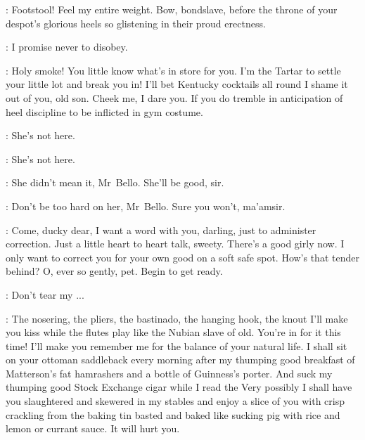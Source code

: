 \Bello:
Footstool!
Feel my entire weight.
Bow, bondslave, before the throne of your despot's glorious heels
so glistening in their proud erectness.

\Bloom:
I promise never to disobey.

\Bello:
Holy smoke!
You little know what's in store for you.
I'm the Tartar to settle your little lot and break you in!
I'll bet Kentucky cocktails all round I shame it out of you, old son.
Cheek me, I dare you.
If you do tremble in anticipation of heel discipline
to be inflicted in gym costume.%


\Zoe:
She's not here.

\Bloom:
She's not here.

\Florry:
She didn't mean it, Mr~Bello.
She'll be good, sir.

\Kitty:
Don't be too hard on her, Mr~Bello.
Sure you won't, ma'amsir.

\Bello:
Come, ducky dear, I want a word with you, darling,
just to administer correction.
Just a little heart to heart talk, sweety.
There's a good girly now.
I only want to correct you for your own good on a soft safe spot.
How's that tender behind?
O, ever so gently, pet.
Begin to get ready.

\Bloom:
Don't tear my ...

\Bello:
The nosering, the pliers, the bastinado, the hanging hook,
the knout I'll make you kiss while the flutes play like the Nubian slave of old.
You're in for it this time!
I'll make you remember me for the balance of your natural life.
I shall sit on your ottoman saddleback every morning after
my thumping good breakfast of Matterson's fat hamrashers
and a bottle of Guinness's porter.
And suck my thumping good Stock Exchange cigar
while I read the 
Very possibly I shall have you slaughtered and skewered in my stables
and enjoy a slice of you with crisp crackling from the baking tin
basted and baked like sucking pig with rice and lemon or currant sauce.
It will hurt you.

